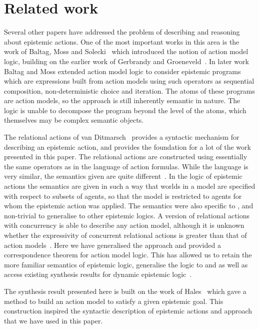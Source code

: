 \section{Related work}\label{related-work}

Several other papers have addressed the problem of describing and reasoning about epistemic actions.
One of the most important works in this area is the work of Baltag, Moss and Solecki~\cite{baltag:1998} which introduced the notion of action model logic, building on the earlier work of Gerbrandy and Groeneveld~\cite{gerbrandy:1997}.
In later work Baltag and Moss extended action model logic to consider epistemic programs~\cite{baltag:2004} which are expressions built from action models using such operators as sequential composition, non-deterministic choice and iteration.
The atoms of these programs are action models, so the approach is still inherently semantic in nature.
The logic is unable to decompose the program beyond the level of the atoms, which themselves may be complex semantic objects.

The relational actions of van Ditmarsch~\cite{vanditmarsch:2000} provides a syntactic mechanism for describing an epistemic action, and provides the foundation for a lot of the work presented in this paper.
The relational actions are constructed using essentially the same operators as in the language of action formulas.
While the language is very similar, the semantics given are quite different~\cite{vanditmarsch:2007}.
In the logic of epistemic actions the semantics are given in such a way that worlds in a model are specified with respect to subsets of agents, so that the model is restricted to agents for whom the epistemic action was applied.
The semantics were also specific to \classS{}, and non-trivial to generalise to other epistemic logics.
A version of relational actions with concurrency is able to describe any \classS{} action model, although it is unknown whether the expressivity of concurrent relational actions is greater than that of action models~\cite{baltag:2006}.
Here we have generalised the approach and provided a correspondence theorem for action model logic.
This has allowed us to retain the more familiar semantics of epistemic logic, generalise the logic to \classK{} and \classKFF{} as well as access existing synthesis results for dynamic epistemic logic~\cite{hales:2013}.

The synthesis result presented here is built on the work of Hales~\cite{hales:2013} which gave a method to build an action model to satisfy a given epistemic goal.
This construction inspired the syntactic description of epistemic actions and approach that we have used in this paper.

